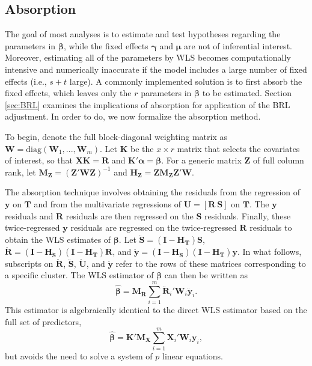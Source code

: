 \documentclass[12pt]{article}\usepackage[]{graphicx}\usepackage[]{color}
\newcommand{\bm}{\mathbf}
\newcommand{\bs}{\boldsymbol}
\begin{document}
\subsection{Absorption}

The goal of most analyses is to estimate and test hypotheses regarding the parameters in $\bs\beta$, while the fixed effects $\bs\gamma$ and $\bs\mu$ are not of inferential interest. Moreover, estimating all of the parameters by WLS becomes computationally intensive and numerically inaccurate if the model includes a large number of fixed effects (i.e., $s + t$ large). 
A commonly implemented solution is to first absorb the fixed effects, which leaves only the $r$ parameters in $\bs\beta$ to be estimated. 
Section \ref{sec:BRL} examines the implications of absorption for application of the BRL adjustment. 
In order to do, we now formalize the absorption method.

To begin, denote the full block-diagonal weighting matrix as $\bm{W} = \text{diag}\left(\bm{W}_1,...,\bm{W}_m\right)$.
Let $\bm{K}$ be the $x \times r$ matrix that selects the covariates of interest, so that $\bm{X} \bm{K} = \bm{R}$ and $\bm{K}'\bs\alpha = \bs\beta$.
For a generic matrix $\bm{Z}$ of full column rank, let $\bm{M_Z} = \left(\bm{Z}'\bm{W}\bm{Z}\right)^{-1}$ and $\bm{H_Z} = \bm{Z}\bm{M_Z}\bm{Z}'\bm{W}$. 

The absorption technique involves obtaining the residuals from the regression of $\bm{y}$ on $\bm{T}$ and from the multivariate regressions of $\bm{U} = [\bm{R}\ \bm{S}]$ on $\bm{T}$. 
The $\bm{y}$ residuals and $\bm{R}$ residuals are then regressed on the $\bm{S}$ residuals. 
Finally, these twice-regressed $\bm{y}$ residuals are regressed on the twice-regressed $\bm{R}$ residuals to obtain the WLS estimates of $\bs\beta$. 
Let $\bm{\ddot{S}} = \left(\bm{I} - \bm{H_T}\right)\bm{S}$, $\bm{\ddot{R}} = \left(\bm{I} - \bm{H_{\ddot{S}}}\right)\left(\bm{I} - \bm{H_T}\right)\bm{R}$, and $\bm{\ddot{y}} = \left(\bm{I} - \bm{H_{\ddot{S}}}\right)\left(\bm{I} - \bm{H_T}\right)\bm{y}$. 
In what follows, subscripts on $\bm{\ddot{R}}$, $\bm{\ddot{S}}$,  $\bm{\ddot{U}}$, and $\bm{\ddot{y}}$ refer to the rows of these matrices corresponding to a specific cluster. 
The WLS estimator of $\bs\beta$ can then be written as
\begin{equation}
\label{eq:WLS}
\bs{\hat\beta} = \bm{M_{\ddot{R}}} \sum_{i=1}^m \bm{\ddot{R}}_i' \bm{W}_i \bm{\ddot{y}}_i. 
\end{equation}
This estimator is algebraically identical to the direct WLS estimator based on the full set of predictors, \[
\bs{\hat\beta} = \bm{K}'\bm{M_X} \sum_{i=1}^m \bm{X}_i' \bm{W}_i \bm{y}_i,
\]
but avoids the need to solve a system of $p$ linear equations.
\end{document}
